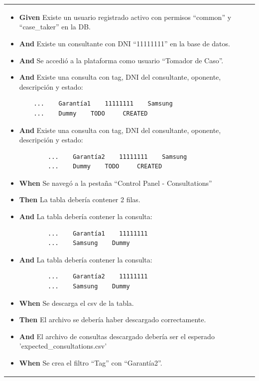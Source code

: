 \begin{longtable}{|p{1cm}|p{2.5cm}|p{12cm}|}
    \begin{itemize}
        \item \textbf{Given} Existe un usuario registrado activo con permisos ``common'' y ``case\_taker'' en la DB.
        \item \textbf{And} Existe un consultante con DNI ``11111111'' en la base de datos.
        \item \textbf{And} Se accedió a la plataforma como usuario ``Tomador de Caso''.
        \item \textbf{And} Existe una consulta con tag, DNI del consultante, oponente, descripción y estado:
        \begin{verbatim}
    ...    Garantía1    11111111    Samsung
    ...    Dummy    TODO     CREATED
        \end{verbatim}
        \item \textbf{And} Existe una consulta con tag, DNI del consultante, oponente, descripción y estado:
        \begin{verbatim}
        ...    Garantía2    11111111    Samsung
        ...    Dummy    TODO     CREATED
        \end{verbatim}
        \item \textbf{When} Se navegó a la pestaña ``Control Panel - Consultations''
    
        \item \textbf{Then} La tabla debería contener 2 filas.
        \item \textbf{And} La tabla debería contener la consulta:
        \begin{verbatim}
        ...    Garantía1    11111111
        ...    Samsung    Dummy
        \end{verbatim}
        \item \textbf{And} La tabla debería contener la consulta:
        \begin{verbatim}
        ...    Garantía2    11111111
        ...    Samsung    Dummy
        \end{verbatim}

        \item \textbf{When} Se descarga el csv de la tabla.

        \item \textbf{Then} El archivo se debería haber descargado correctamente.
        \item \textbf{And} El archivo de consultas descargado debería ser el esperado 'expected\_consultations.csv'
    
        \item \textbf{When} Se crea el filtro ``Tag'' con ``Garantía2''.
    

\end{itemize}
\end{longtable}
